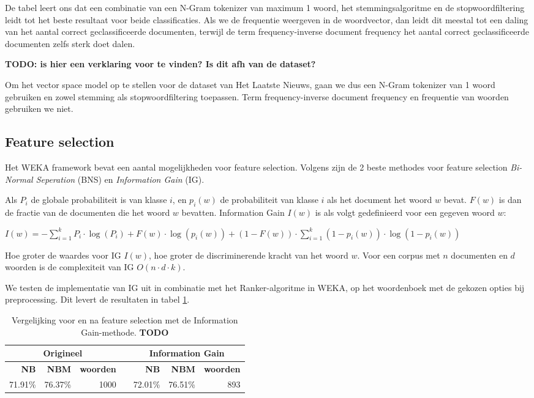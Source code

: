 De tabel leert ons dat een combinatie van een N-Gram tokenizer van maximum 1 woord, het stemmingsalgoritme en de stopwoordfiltering leidt tot het beste resultaat voor beide classificaties. Als we de frequentie weergeven in de woordvector, dan leidt dit meestal tot een daling van het aantal correct geclassificeerde documenten, terwijl de term frequency-inverse document frequency het aantal correct geclassificeerde documenten zelfs sterk doet dalen. 

\textbf{TODO: is hier een verklaring voor te vinden? Is dit afh van de dataset?}

Om het vector space model op te stellen voor de dataset van Het Laatste Nieuws, gaan we dus een N-Gram tokenizer van 1 woord gebruiken en zowel stemming als stopwoordfiltering toepassen. Term frequency-inverse document frequency en frequentie van woorden gebruiken we niet.

\subsection{Feature selection}\label{IG}
Het WEKA framework bevat een aantal mogelijkheden voor feature selection. Volgens \cite{Forman2003} zijn de 2 beste methodes voor feature selection \textit{Bi-Normal Seperation} (BNS) en \textit{Information Gain} (IG). 

Als $P_i$ de globale probabiliteit is van klasse $i$, en $p_{i}(w)$ de probabiliteit van klasse $i$ als het document het woord $w$ bevat. $F(w)$ is dan de fractie van de documenten die het woord $w$ bevatten. Information Gain $I(w)$ is als volgt gedefinieerd voor een gegeven woord  $w$:

\begin{math}
I(w) = -\sum_{i=1}^{k}P_i\cdot\log{(P_i)} + F(w)\cdot\log(p_i(w)) + (1 - F(w))\cdot\sum_{i=1}^{k}(1-p_i(w))\cdot\log(1-p_i(w))
\end{math}

Hoe groter de waardes voor IG $I(w)$, hoe groter de discriminerende kracht van het woord $w$. Voor een corpus met $n$ documenten en $d$ woorden is de complexiteit van IG $O(n \cdot d \cdot k)$.

We testen de implementatie van IG uit  in combinatie met het Ranker-algoritme in WEKA, op het woordenboek met de gekozen opties bij preprocessing. Dit levert de resultaten in tabel \ref{tab:feature-selection}.

\begin{table}[htbp]
	\centering
	\caption{Vergelijking voor en na feature selection met de Information Gain-methode. \textbf{TODO}}
	\begin{tabular}{rrrrrrr}
		\toprule
		\multicolumn{3}{c}{\textbf{Origineel}} & \multicolumn{1}{c|}{\textbf{}} & \multicolumn{3}{c}{\textbf{Information Gain}} \\
		\midrule
		\textbf{NB} & \textbf{NBM} & \textbf{woorden}    &   \multicolumn{1}{c|}{}   & \textbf{NB} & \textbf{NBM} & \textbf{woorden} \\
		71.91\% & 76.37\% & 1000  &   \multicolumn{1}{c|}{}    & 72.01\% & 76.51\% & 893 \\
		\bottomrule
	\end{tabular}%
	\label{tab:feature-selection}%
\end{table}%

